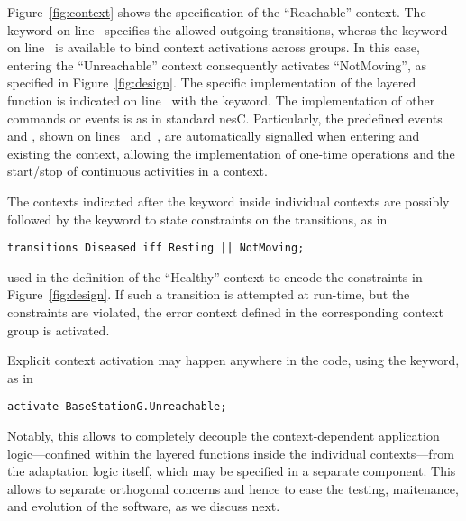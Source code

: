 Figure~\ref{fig:context} shows the \conesc specification of the
``Reachable'' context. The keyword  on
line~ specifies the allowed outgoing transitions, wheras
the keyword  on line~ is available
to bind context activations across groups. In this case, entering the
``Unreachable'' context consequently activates ``NotMoving'', as
specified in Figure~\ref{fig:design}. The specific implementation of
the layered function is indicated on line~ with the
 keyword.  The implementation of other commands or
events is as in standard nesC. Particularly, the predefined events
 and , shown on
lines~ and~, are
automatically signalled when entering and existing the context,
allowing the implementation of one-time operations and the start/stop
of continuous activities in a context.

The contexts indicated after the  keyword inside
individual contexts are possibly followed by the  keyword to
state constraints on the transitions, as in
\begin{lstlisting}[language=conesc]
transitions Diseased iff Resting || NotMoving;
\end{lstlisting}
used in the definition of the ``Healthy'' context to encode the
constraints in Figure~\ref{fig:design}. If such a transition is
attempted at run-time, but the constraints are violated, the error
context defined in the corresponding context group is activated. 

Explicit context activation may happen anywhere in the code, using the
 keyword, as in
\begin{lstlisting}[language=conesc]
activate BaseStationG.Unreachable;
\end{lstlisting}
Notably, this allows to completely decouple the context-dependent
application logic---confined within the layered functions inside the
individual contexts---from the adaptation logic itself, which may be
specified in a separate component. This allows to separate orthogonal
concerns and hence to ease the testing, maitenance, and evolution of
the software, as we discuss next.

